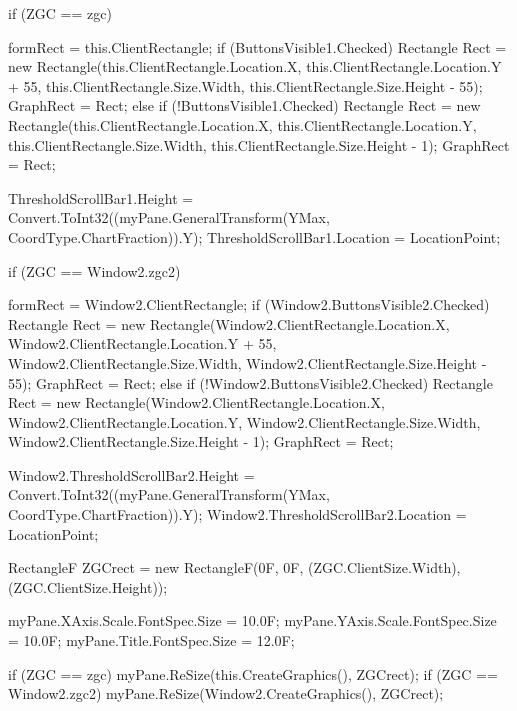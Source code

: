 {{{{                if (ZGC == zgc)
                {

                    formRect = this.ClientRectangle;
                    if (ButtonsVisible1.Checked)
                    {
                        Rectangle Rect = new Rectangle(this.ClientRectangle.Location.X, this.ClientRectangle.Location.Y + 55, this.ClientRectangle.Size.Width, this.ClientRectangle.Size.Height - 55);
                        GraphRect = Rect;
                    }
                    else if (!ButtonsVisible1.Checked)
                    {
                        Rectangle Rect = new Rectangle(this.ClientRectangle.Location.X, this.ClientRectangle.Location.Y, this.ClientRectangle.Size.Width, this.ClientRectangle.Size.Height - 1);
                        GraphRect = Rect;
                    }

                    ThresholdScrollBar1.Height = Convert.ToInt32((myPane.GeneralTransform(YMax, CoordType.ChartFraction)).Y);
                    ThresholdScrollBar1.Location = LocationPoint;
                }

                if (ZGC == Window2.zgc2)
                {
                    formRect = Window2.ClientRectangle;
                    if (Window2.ButtonsVisible2.Checked)
                    {
                        Rectangle Rect = new Rectangle(Window2.ClientRectangle.Location.X, Window2.ClientRectangle.Location.Y + 55, Window2.ClientRectangle.Size.Width, Window2.ClientRectangle.Size.Height - 55);
                        GraphRect = Rect;
                    }
                    else if (!Window2.ButtonsVisible2.Checked)
                    {
                        Rectangle Rect = new Rectangle(Window2.ClientRectangle.Location.X, Window2.ClientRectangle.Location.Y, Window2.ClientRectangle.Size.Width, Window2.ClientRectangle.Size.Height - 1);
                        GraphRect = Rect;
                    }

                    Window2.ThresholdScrollBar2.Height = Convert.ToInt32((myPane.GeneralTransform(YMax, CoordType.ChartFraction)).Y);
                    Window2.ThresholdScrollBar2.Location = LocationPoint;
                }
                RectangleF ZGCrect = new RectangleF(0F, 0F, (ZGC.ClientSize.Width), (ZGC.ClientSize.Height));

                myPane.XAxis.Scale.FontSpec.Size = 10.0F;
                myPane.YAxis.Scale.FontSpec.Size = 10.0F;
                myPane.Title.FontSpec.Size = 12.0F;

                if (ZGC == zgc)
                {
                    myPane.ReSize(this.CreateGraphics(), ZGCrect);
                }
                if (ZGC == Window2.zgc2)
                {
                    myPane.ReSize(Window2.CreateGraphics(), ZGCrect);
                }

}}}}
